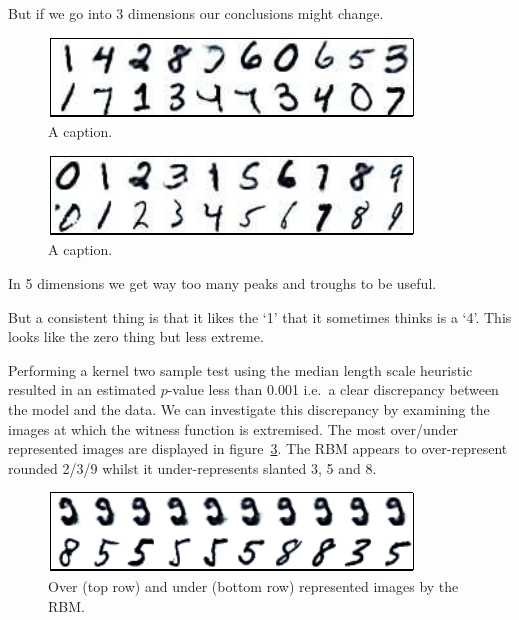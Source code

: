 \documentclass{article}
\def\ie{i.e.\ }
\begin{document}
But if we go into 3 dimensions our conclusions might change.

\begin{figure}[ht]
\centering
\includegraphics[width=0.98\columnwidth]{figures/dbn_ft_3_witness_peaks}
\caption{
A caption.
}
\label{fig:dbn_ft_witness_peaks}
\end{figure}

\begin{figure}[ht]
\centering
\includegraphics[width=0.98\columnwidth]{figures/dbn_ft_3_cond}
\caption{
A caption.
}
\label{fig:dbn_ft_cond}
\end{figure}

In 5 dimensions we get way too many peaks and troughs to be useful.

But a consistent thing is that it likes the `1' that it sometimes thinks is a `4'.
This looks like the zero thing but less extreme.


Performing a kernel two sample test using the median length scale heuristic resulted in an estimated $p$-value less than 0.001 \ie a clear discrepancy between the model and the data.
We can investigate this discrepancy by examining the images at which the witness function is extremised.
The most over/under represented images are displayed in figure~\ref{fig:rbm_over_under}.
The RBM appears to over-represent rounded 2/3/9 whilst it under-represents slanted 3, 5 and 8.

\begin{figure}[ht]
\centering
\includegraphics[width=0.98\columnwidth]{figures/rbm_over_under}
\caption{
Over (top row) and under (bottom row) represented images by the RBM.
}
\label{fig:rbm_over_under}
\end{figure}
\end{document}
